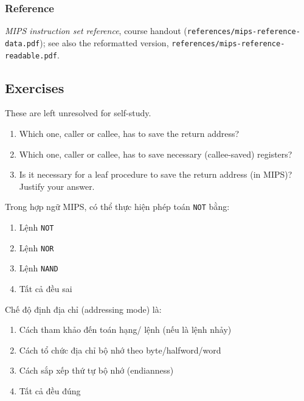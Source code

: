 \subsubsection{Reference}
\emph{MIPS instruction set reference}, course handout
(\texttt{references/mips-reference-data.pdf}); see also the reformatted
version, \texttt{references/mips-reference-readable.pdf}.

\subsection{Exercises}

These are left unresolved for self-study.

\begin{exercise}
\leavevmode
\begin{enumerate}[label=(\arabic*)]
  \item Which one, caller or callee, has to save the return address?
  \item Which one, caller or callee, has to save necessary (callee-saved)
  registers?
  \item Is it necessary for a leaf procedure to save the return address (in
  MIPS)? Justify your answer.
\end{enumerate}
\end{exercise}

\begin{exercise}
{\arialfont Trong hợp ngữ MIPS, có thể thực hiện phép toán \texttt{NOT} bằng:
\begin{enumerate}[label=\alph*.]
\item Lệnh \texttt{NOT}
\item Lệnh \texttt{NOR}
\item Lệnh \texttt{NAND}
\item Tất cả đều sai
\end{enumerate}}
\end{exercise}

\begin{exercise}
{\arialfont Chế độ định địa chỉ (addressing mode) là:
\begin{enumerate}[label=\alph*.]
\item Cách tham khảo đến toán hạng/ lệnh (nếu là lệnh nhảy)
\item Cách tổ chức địa chỉ bộ nhớ theo byte/halfword/word
\item Cách sắp xếp thứ tự bộ nhớ (endianness)
\item Tất cả đều đúng
\end{enumerate}}
\end{exercise}

